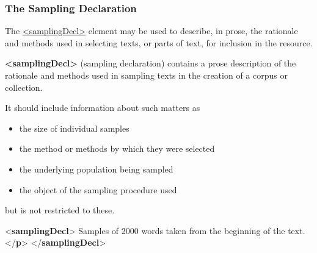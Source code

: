 \subsubsection[{The Sampling Declaration}]{The Sampling Declaration}\label{HD52}\par
The \hyperref[TEI.samplingDecl]{<samplingDecl>} element may be used to describe, in prose, the rationale and methods used in selecting texts, or parts of text, for inclusion in the resource. 
\begin{sansreflist}
  
\item [\textbf{<samplingDecl>}] (sampling declaration) contains a prose description of the rationale and methods used in sampling texts in the creation of a corpus or collection.
\end{sansreflist}
 It should include information about such matters as \begin{itemize}
\item the size of individual samples
\item the method or methods by which they were selected
\item the underlying population being sampled
\item the object of the sampling procedure used
\end{itemize}  but is not restricted to these.    \par\bgroup{}\exampleFont \begin{shaded}\noindent\mbox{}{<\textbf{samplingDecl}>}\mbox{}\newline 
{}Samples of 2000 words taken from the beginning of the text.{</\textbf{p}>}\mbox{}\newline 
{</\textbf{samplingDecl}>}\end{shaded}\egroup\par \par
